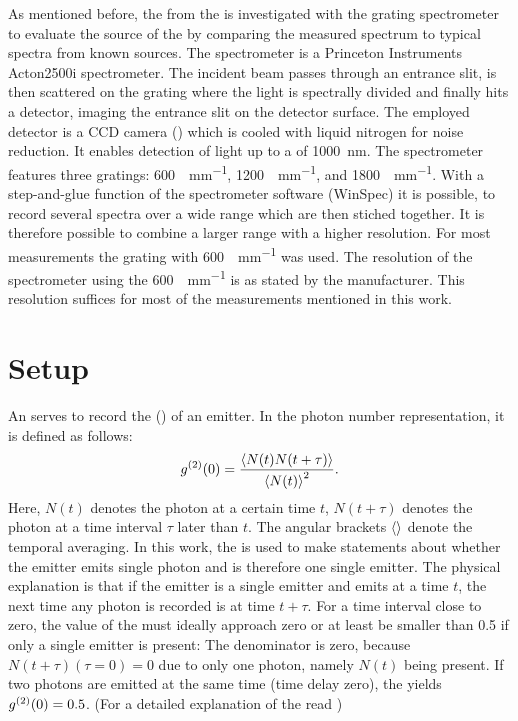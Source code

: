 		As mentioned before, the \fl from the \sivs is investigated with the grating spectrometer to evaluate the source of the \fl by comparing the measured spectrum to typical spectra from known sources.
		The spectrometer is a Princeton Instruments Acton2500i  spectrometer.
		The incident beam passes through an entrance slit, is then scattered on the grating where the light is spectrally divided and finally hits a detector, imaging the entrance slit on the detector surface.
		The employed detector is a CCD camera () which is cooled with liquid nitrogen for noise reduction.
		It enables detection of light up to a \wl of \SI{1000}{nm}.
		The spectrometer features three gratings: \SI[per-mode=symbol]{600}{\lines\per\mm}, \SI[per-mode=symbol]{1200}{\lines\per\mm}, and \SI[per-mode=symbol]{1800}{\lines\per\mm}.
		With a step-and-glue function of the spectrometer software (WinSpec) it is possible, to record several spectra over a wide \wl range which are then stiched together.
		It is therefore possible to combine a larger \wl range with a higher resolution.
		For most measurements the grating with \SI[per-mode=symbol]{600}{\lines\per\mm} was used. 
		The resolution of the spectrometer using the \SI{600}{\lines\per\mm} is  as stated by the manufacturer.
		This resolution suffices for most of the measurements mentioned in this work.

	\section[HBT]{\HBT Setup}

		An  serves to record the  () of an emitter.
		In the photon number representation, it is defined as follows:
		\[
		g^{(2)}(0) = \frac{ \left\langle  N(t) N(t+\tau) \right\rangle }{\left\langle N(t)\right\rangle^2}.
		\]
		Here, $N(t)$ denotes the photon at a certain time $t$, $N(t+\tau)$ denotes the photon at a time interval $\tau$ later than $t$.
		The angular brackets $\left\langle \right\rangle$ denote the temporal averaging.
		In this work, the \gtf is used to make statements about whether the emitter emits single photon and is therefore one single emitter.
		The physical explanation is  that if the emitter is a single emitter and emits at a time $t$, the next time any photon is recorded is at time $t+\tau$.
		For a time interval close to zero, the value of the \gtf must ideally approach zero or at least be smaller than \num{0.5} if only a single emitter is present:
		The denominator is zero, because $N(t + \tau) (\tau = 0)=0$ due to only one photon, namely $N(t)$ being present.
		If two photons are emitted at the same time (time delay zero), the \gtf yields $g^{(2)}(0)=0.5$. 
		(For a detailed explanation of the \gtf read \cite{fox})


